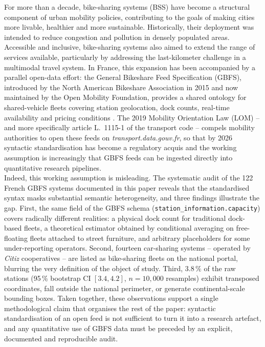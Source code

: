 \documentclass[a4paper,twoside]{article}
\begin{document}
For more than a decade, bike-sharing systems (BSS) have become a
structural component of urban mobility policies, contributing to
the goals of making cities more livable, healthier and more
sustainable. Historically, their deployment was intended to reduce
congestion and pollution in densely populated areas. Accessible
and inclusive, bike-sharing systems also aimed to extend the
range of services available, particularly by addressing the
last-kilometer challenge in a multimodal travel system. In
France, this expansion has been accompanied by a parallel
open-data effort: the General Bikeshare Feed Specification
(GBFS), introduced by the North American Bikeshare Association in
2015 and now maintained by the Open Mobility Foundation, provides
a shared ontology for shared-vehicle fleets covering station
geolocation, dock counts, real-time availability and pricing
conditions \cite{Mobi2024,OMF2023}. The 2019 Mobility Orientation
Law (LOM) -- and more specifically article L.~1115-1 of the
transport code -- compels mobility authorities to open these
feeds on \emph{transport.data.gouv.fr}, so that by 2026 syntactic
standardisation has become a regulatory acquis and the working
assumption is increasingly that GBFS feeds can be ingested
directly into quantitative research pipelines.\\

Indeed, this working assumption is misleading. The systematic
audit of the 122 French GBFS systems documented in this paper
reveals that the standardised syntax masks substantial semantic
heterogeneity, and three findings illustrate the gap. First, the
same field of the GBFS schema
(\texttt{station\_information.capacity}) covers radically
different realities: a physical dock count for traditional
dock-based fleets, a theoretical estimator obtained by
conditional averaging on free-floating fleets attached to street
furniture, and arbitrary placeholders for some under-reporting
operators. Second, fourteen car-sharing systems -- operated by
\emph{Citiz} cooperatives -- are listed as bike-sharing fleets on
the national portal, blurring the very definition of the object
of study. Third, $3.8\,\%$ of the raw stations (95\,\% bootstrap CI
$[3.4, 4.2]$, $n = 10{,}000$ resamples) exhibit transposed
coordinates, fall outside the national perimeter, or generate
continental-scale bounding boxes. Taken together, these
observations support a single methodological claim that organises
the rest of the paper: syntactic standardisation of an open feed
is not sufficient to turn it into a research artefact, and any
quantitative use of GBFS data must be preceded by an explicit,
documented and reproducible audit.\\
\end{document}
